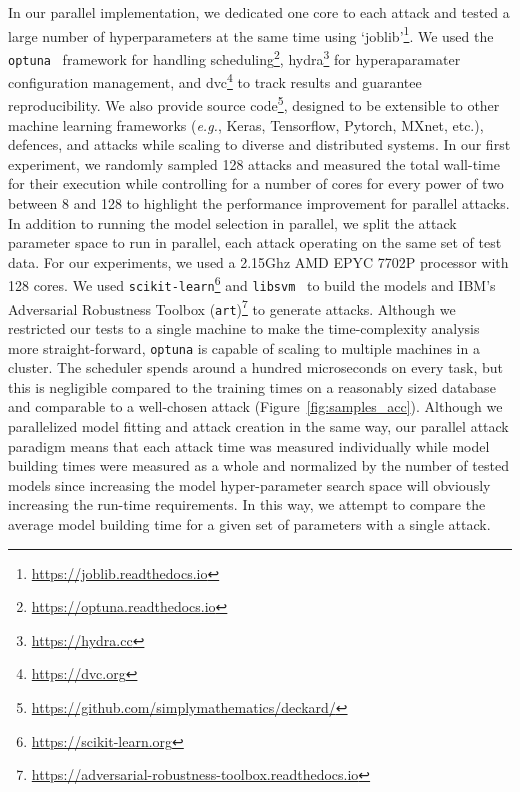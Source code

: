 \documentclass[runningheads]{llncs}
\begin{document}
In our parallel implementation, we dedicated one core to each attack and tested a large number of hyperparameters at the same time using `joblib'\footnote{\href{https://joblib.readthedocs.io}{https://joblib.readthedocs.io}}. We used the \texttt{optuna}~\cite{optuna} framework for handling scheduling\footnote{\href{https://optuna.readthedocs.io}{https://optuna.readthedocs.io}}, hydra\footnote{\href{https://hydra.cc}{https://hydra.cc}} for hyperaparamater configuration management, and dvc\footnote{\href{https://dvc.org}{https://dvc.org}} to track results and guarantee reproducibility. We also provide source code\footnote{\href{https://github.com/simplymathematics/deckard/}{https://github.com/simplymathematics/deckard/}}, designed to be extensible to other machine learning frameworks (\textit{e.g.}, Keras, Tensorflow, Pytorch, MXnet, etc.), defences, and attacks while scaling to diverse and distributed systems. In our first experiment, we randomly sampled 128 attacks and measured the total wall-time for their execution while controlling for a number of cores for every power of two between 8 and 128 to highlight the performance improvement for parallel attacks. In addition to running the model selection in parallel, we split the attack parameter space to run in parallel, each attack operating on the same set of test data. For our experiments, we used a 2.15Ghz AMD EPYC 7702P processor with 128 cores. We used \texttt{scikit-learn}\footnote{\href{https://scikit-learn.org/}{https://scikit-learn.org}} and \texttt{libsvm}~\cite{chang2011libsvm} to build the models and IBM's Adversarial Robustness Toolbox (\texttt{art})\footnote{\href{https://adversarial-robustness-toolbox.readthedocs.io/}{https://adversarial-robustness-toolbox.readthedocs.io}} to generate attacks.  Although we restricted our tests to a single machine to make the time-complexity analysis more straight-forward, \texttt{optuna} is capable of scaling to multiple machines in a cluster. The scheduler spends around a hundred microseconds on every task, but this is negligible compared to the training times on a reasonably sized database and comparable to a well-chosen attack (Figure~\ref{fig:samples_acc}). Although we parallelized model fitting and attack creation in the same way, our parallel attack paradigm means that each attack time was measured individually while model building times were measured as a whole and normalized by the number of tested models since increasing the model hyper-parameter search space will obviously increasing the run-time requirements. In this way, we attempt to compare the average model building time for a given set of parameters with a single attack.
\end{document}
